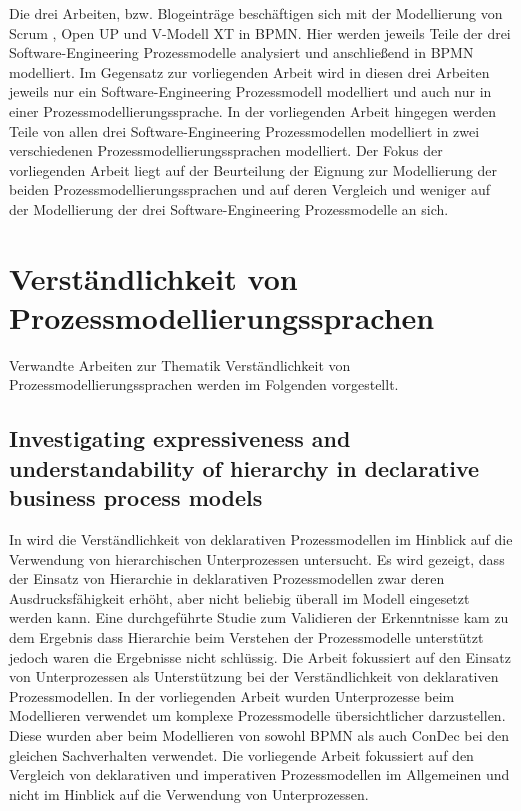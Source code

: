Die drei Arbeiten, bzw. Blogeinträge beschäftigen sich mit der Modellierung von Scrum \cite{software}, Open UP \cite{brunner2007fallstudie} und \cite{Bregenzer2014} V-Modell XT in BPMN. Hier werden jeweils Teile der drei Software-Engineering Prozessmodelle analysiert und anschließend in BPMN modelliert.\newline
Im Gegensatz zur vorliegenden Arbeit wird in diesen drei Arbeiten jeweils nur ein Software-Engineering Prozessmodell modelliert und auch nur in einer Prozessmodellierungssprache. In der vorliegenden Arbeit hingegen werden Teile von allen drei Software-Engineering Prozessmodellen modelliert in zwei verschiedenen Prozessmodellierungssprachen modelliert. Der Fokus der vorliegenden Arbeit liegt auf der Beurteilung der Eignung zur Modellierung der beiden Prozessmodellierungssprachen und auf deren Vergleich und weniger auf der Modellierung der drei Software-Engineering Prozessmodelle an sich.\newline


\section{Verständlichkeit von Prozessmodellierungssprachen}

Verwandte Arbeiten zur Thematik Verständlichkeit von Prozessmodellierungssprachen werden im Folgenden vorgestellt.

\subsection{Investigating expressiveness and understandability of hierarchy
in declarative business process models}

In \cite{sabrina942} wird die Verständlichkeit von deklarativen Prozessmodellen im Hinblick auf die Verwendung von hierarchischen Unterprozessen untersucht. Es wird gezeigt, dass der Einsatz von Hierarchie in deklarativen Prozessmodellen zwar deren Ausdrucksfähigkeit erhöht, aber nicht beliebig überall im Modell eingesetzt werden kann. Eine durchgeführte Studie zum Validieren der Erkenntnisse kam zu dem Ergebnis dass Hierarchie beim Verstehen der Prozessmodelle unterstützt jedoch waren die Ergebnisse nicht schlüssig.\newline
Die Arbeit  \cite{sabrina942} fokussiert auf den Einsatz von Unterprozessen als Unterstützung bei der Verständlichkeit von deklarativen Prozessmodellen. In der vorliegenden Arbeit wurden Unterprozesse beim Modellieren verwendet um komplexe Prozessmodelle übersichtlicher darzustellen. Diese wurden  aber beim Modellieren von sowohl BPMN als auch ConDec bei den gleichen Sachverhalten verwendet. Die vorliegende Arbeit fokussiert auf den Vergleich von deklarativen und imperativen Prozessmodellen im Allgemeinen und nicht im Hinblick auf die Verwendung von Unterprozessen. \newline


